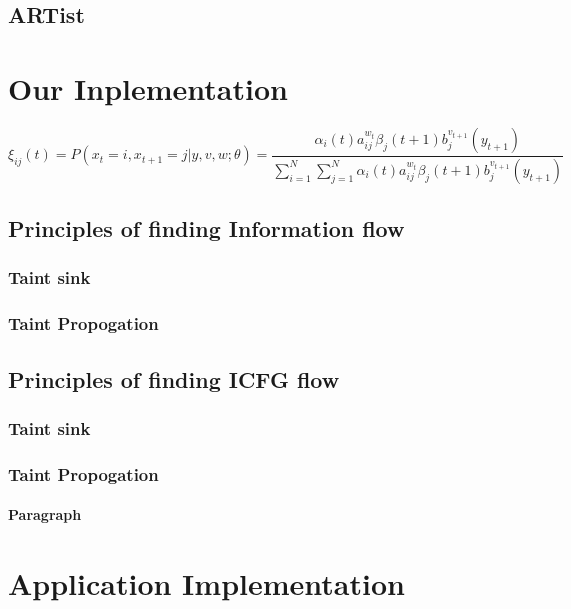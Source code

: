 \documentclass{article}
\begin{document}
\subsection{ARTist}


\section{Our Inplementation}
\lipsum[5]
\begin{equation}
\xi _{ij}(t)=P(x_{t}=i,x_{t+1}=j|y,v,w;\theta)= {\frac {\alpha _{i}(t)a^{w_t}_{ij}\beta _{j}(t+1)b^{v_{t+1}}_{j}(y_{t+1})}{\sum _{i=1}^{N} \sum _{j=1}^{N} \alpha _{i}(t)a^{w_t}_{ij}\beta _{j}(t+1)b^{v_{t+1}}_{j}(y_{t+1})}}
\end{equation}



\subsection{Principles of finding Information flow}
\lipsum[5]
\subsubsection{Taint sink}
\lipsum[5]
\subsubsection{Taint Propogation}
\lipsum[5]

\subsection{Principles of finding ICFG flow}
\lipsum[5]
\subsubsection{Taint sink}
\lipsum[5]
\subsubsection{Taint Propogation}
\lipsum[5]




\paragraph{Paragraph}
\lipsum[7]

\section{Application Implementation}
\end{document}
